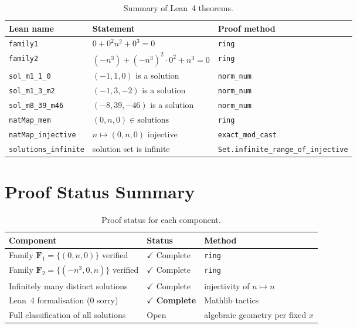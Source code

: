 \documentclass[12pt,a4paper]{article}
\theoremstyle{definition}
\begin{document}
\begin{table}[h]
\centering
\caption{Summary of Lean~4 theorems.}
\label{tab:lean}
\begin{tabular}{lll}
\toprule
Lean name & Statement & Proof method \\
\midrule
\texttt{family1} & $0 + 0^2 n^2 + 0^3 = 0$ & \texttt{ring} \\
\texttt{family2} & $(-n^3) + (-n^3)^2 \cdot 0^2 + n^3 = 0$ & \texttt{ring} \\
\texttt{sol\_m1\_1\_0} & $(-1,1,0)$ is a solution & \texttt{norm\_num} \\
\texttt{sol\_m1\_3\_m2} & $(-1,3,-2)$ is a solution & \texttt{norm\_num} \\
\texttt{sol\_m8\_39\_m46} & $(-8,39,-46)$ is a solution & \texttt{norm\_num} \\
\texttt{natMap\_mem} & $(0, n, 0) \in \text{solutions}$ & \texttt{ring} \\
\texttt{natMap\_injective} & $n \mapsto (0, n, 0)$ injective & \texttt{exact\_mod\_cast} \\
\texttt{solutions\_infinite} & solution set is infinite & \texttt{Set.infinite\_range\_of\_injective} \\
\bottomrule
\end{tabular}
\end{table}

\section{Proof Status Summary}

\begin{table}[h]
\centering
\caption{Proof status for each component.}
\begin{tabular}{lll}
\toprule
Component & Status & Method \\
\midrule
Family $\mathbf{F}_1 = \{(0, n, 0)\}$ verified & $\checkmark$ Complete & \texttt{ring} \\
Family $\mathbf{F}_2 = \{(-n^3, 0, n)\}$ verified & $\checkmark$ Complete & \texttt{ring} \\
Infinitely many distinct solutions & $\checkmark$ Complete & injectivity of $n \mapsto n$ \\
Lean~4 formalisation (0 sorry) & $\checkmark$ \textbf{Complete} & Mathlib tactics \\
Full classification of all solutions & Open & algebraic geometry per fixed $x$ \\
\bottomrule
\end{tabular}
\end{table}
\end{document}
